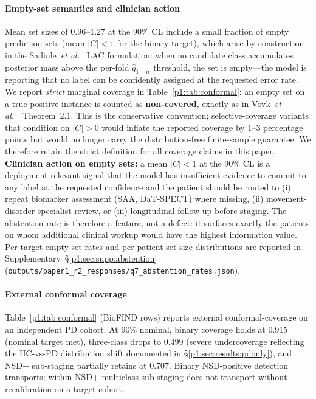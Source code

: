 \paragraph*{Empty-set semantics and clinician action} Mean set sizes of 0.96--1.27 at the 90\% CL include a small fraction of empty prediction sets (mean $|C|<1$ for the binary target), which arise by construction in the Sadinle~\textit{et al.}~\cite{sadinle2019lac} LAC formulation: when no candidate class accumulates posterior mass above the per-fold $\hat{q}_{1-\alpha}$ threshold, the set is empty---the model is reporting that no label can be confidently assigned at the requested error rate. We report \emph{strict} marginal coverage in Table~\ref{p1:tab:conformal}: an empty set on a true-positive instance is counted as \textbf{non-covered}, exactly as in Vovk~\textit{et al.}~\cite{vovk2022}~Theorem~2.1. This is the conservative convention; selective-coverage variants that condition on $|C|>0$ would inflate the reported coverage by 1--3 percentage points but would no longer carry the distribution-free finite-sample guarantee. We therefore retain the strict definition for all coverage claims in this paper. \textbf{Clinician action on empty sets:} a mean $|C|<1$ at the 90\% CL is a deployment-relevant signal that the model has insufficient evidence to commit to any label at the requested confidence and the patient should be routed to (i) repeat biomarker assessment (SAA, DaT-SPECT) where missing, (ii) movement-disorder specialist review, or (iii) longitudinal follow-up before staging. The abstention rate is therefore a feature, not a defect: it surfaces exactly the patients on whom additional clinical workup would have the highest information value. Per-target empty-set rates and per-patient set-size distributions are reported in Supplementary~\S\ref{p1:sec:supp:abstention} (\texttt{outputs/paper1\_r2\_responses/q7\_abstention\_rates.json}).

\paragraph*{External conformal coverage} Table~\ref{p1:tab:conformal} (BioFIND rows) reports external conformal-coverage on an independent PD cohort. At 90\% nominal, binary coverage holds at 0.915 (nominal target met), three-class drops to 0.499 (severe undercoverage reflecting the HC-vs-PD distribution shift documented in \S\ref{p1:sec:results:pdonly}), and NSD+ sub-staging partially retains at 0.707. Binary NSD-positive detection transports; within-NSD+ multiclass sub-staging does not transport without recalibration on a target cohort.

